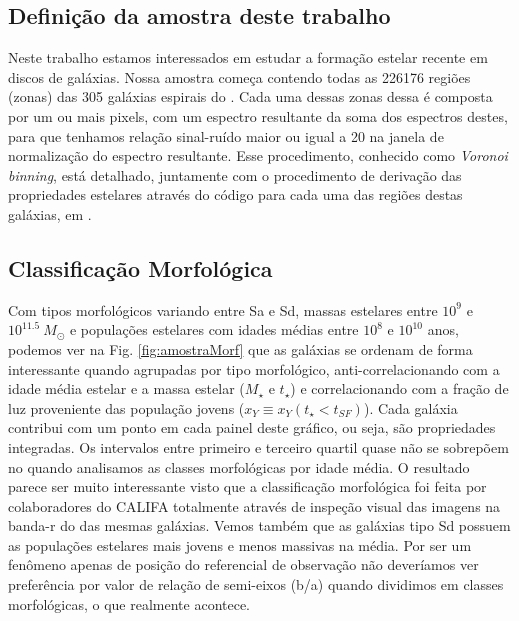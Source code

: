 \subsection{Definição da amostra deste trabalho}
\label{sec:synvsneb:amostra:defin}

Neste trabalho estamos interessados em estudar a formação estelar recente em discos de galáxias.
Nossa amostra começa contendo todas as 226176 regiões (zonas) das 305 galáxias espirais do \CAL.
Cada uma dessas zonas dessa é composta por um ou mais pixels, com um espectro resultante da soma dos
espectros destes, para que tenhamos relação sinal-ruído maior ou igual a 20 na janela de
normalização do espectro resultante. Esse procedimento, conhecido como {\em Voronoi binning}, está
detalhado, juntamente com o procedimento de derivação das propriedades estelares através do código
\starlight para cada uma das regiões destas galáxias, em \citet{CidFernandes.etal.2013a}.

\subsection{Classificação Morfológica}
\label{sec:synvsneb:amostra:morf}

Com tipos morfológicos variando entre Sa e Sd, massas estelares entre $10^9$ e $10^{11.5}\ M_\odot$
e populações estelares com idades médias entre $10^8$ e $10^{10}$ anos, podemos ver na Fig.
\ref{fig:amostraMorf} que as galáxias se ordenam de forma interessante quando agrupadas por tipo
morfológico, anti-correlacionando com a idade média estelar e a massa estelar ($M_\star$ e
$t_\star$) e correlacionando com a fração de luz proveniente das população jovens ($x_Y \equiv x_Y(t_\star <
t_{SF})$). Cada galáxia contribui com um ponto em cada painel deste gráfico, ou seja, são
propriedades integradas. Os intervalos entre primeiro e terceiro quartil quase não se sobrepõem no
quando analisamos as classes morfológicas por idade média. O resultado parece ser muito interessante
visto que a classificação morfológica foi feita por colaboradores do CALIFA totalmente através de
inspeção visual das imagens na banda-r do \SDSS das mesmas galáxias. Vemos também que as galáxias
tipo Sd possuem as populações estelares mais jovens e menos massivas na média. Por ser um fenômeno
apenas de posição do referencial de observação não deveríamos ver preferência por valor de relação
de semi-eixos (b/a) quando dividimos em classes morfológicas, o que realmente acontece.

